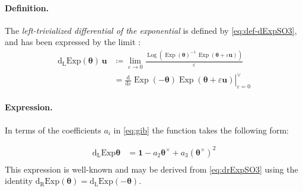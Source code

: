 \paragraph*{Definition.}
The \emph{left-trivialized differential of the exponential} is defined by \eqref{eq:def-dExpSO3}, 
and has been expressed by the limit  \citep{sola2018lie}:
%
\begin{equation*} 
\begin{aligned}
\operatorname{d_{\scriptscriptstyle{L}}Exp} ({\bm{\theta}}) \, \bm{u}
&\coloneq
 \lim _{\varepsilon \rightarrow 0} \frac{\operatorname{Log} \left(\operatorname{Exp}(\bm{\theta})^{-1} \, \operatorname{Exp}(\bm{\theta}+\varepsilon\bm{u})\right)}{\varepsilon} \\
& =\left.\frac{\mathrm{d}}{\mathrm{d} \varepsilon}\operatorname{Exp} (-{\bm{\theta}})\operatorname{Exp} (\bm{\theta}+\varepsilon  \bm{u})\right|_{\varepsilon=0}^{\vee}
\end{aligned}
\end{equation*}
 

\paragraph*{Expression.}

In terms of the coefficients \(a_i\) in \eqref{eq:gib}
the function takes the following form:

\begin{equation}
\begin{aligned}
\operatorname{d_{\scriptscriptstyle{L}}Exp}{\bm{\theta}} &=\mathbf{1} - a_2 \bm{\theta}^{\times} + a_3 \left(\bm{\theta}^{\times}\right)^2 \\
\end{aligned}
\label{eq:RightTanSO3}
\end{equation}
This expression is well-known and may be derived from \eqref{eq:drExpSO3} using the identity \(\operatorname{d_{\scriptscriptstyle{R}}Exp}{(\bm{\theta})} = \operatorname{d_{\scriptscriptstyle{L}}Exp}{(-\bm{\theta})}\).

